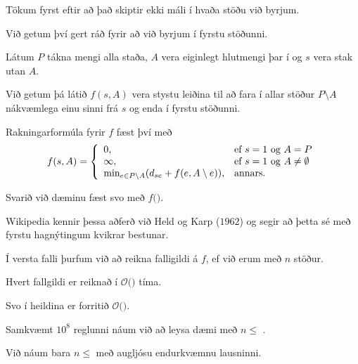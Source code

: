 {
    {
        \item<1-> Tökum fyrst eftir að það skiptir ekki máli í hvaða stöðu við byrjum.
            \item<2-> Við getum því gert ráð fyrir að við byrjum í fyrstu stöðunni.
            \item<3-> Látum $P$ tákna mengi alla staða, $A$ vera eiginlegt hlutmengi þar í og $s$ vera stak utan $A$.
            \item<4-> Við getum þá látið $f(s, A)$ vera stystu leiðina til að fara í allar stöður $P \setminus A$ nákvæmlega einu sinni frá $s$
            og enda í fyrstu stöðunni.
            \item<5-> Rakningarformúla fyrir $f$ fæst því með
            \[
            f(s, A) = 
                \left \{
                \env{array}
        {
            {l l}
            0, & \text{ef $s = 1$ og $A = P$}\\
                \infty, & \text{ef $s = 1$ og $A \neq \emptyset$}\\
                \text{min}_{e \in P \setminus A} (d_{se} + f(e, A \setminus e)), & \text{annars}.
        }
        \right .
            \]
            \item<6-> Svarið við dæminu fæst svo með $f($$)$.
    }
}

{
    {
        \item<1-> Wikipedia kennir þessa aðferð við Held og Karp ($1962$) og segir að þetta sé með fyrstu hagnýtingum kvikrar bestunar.
            \item<2-> Í versta falli þurfum við að reikna  falligildi á $f$, ef við erum með $n$ stöður.
            \item<4-> Hvert fallgildi er reiknað í $\mathcal{O}($$)$ tíma.
            \item<6-> Svo í heildina er forritið $\mathcal{O}($$)$.
            \item<8-> Samkvæmt $10^8$ reglunni náum við að leysa dæmi með $n \leq$ .
            \item<10-> Við náum bara $n \leq$  með augljósu endurkvæmnu lausninni.
    }
}

{
}

